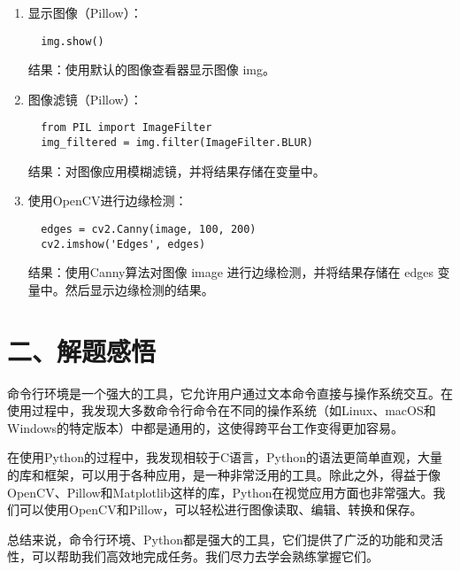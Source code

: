\documentclass[UTF8]{ctexart}
\begin{document}
\begin{enumerate}
  \item 显示图像（Pillow）：
  \begin{verbatim}
  img.show()
  \end{verbatim}
  结果：使用默认的图像查看器显示图像 img。
  
  \item 图像滤镜（Pillow）：
  \begin{verbatim}
  from PIL import ImageFilter
  img_filtered = img.filter(ImageFilter.BLUR)
  \end{verbatim}
  结果：对图像应用模糊滤镜，并将结果存储在变量中。
  
  \item 使用OpenCV进行边缘检测：
  \begin{verbatim}
  edges = cv2.Canny(image, 100, 200)
  cv2.imshow('Edges', edges)
  \end{verbatim}
  结果：使用Canny算法对图像 image 进行边缘检测，并将结果存储在 edges 变量中。然后显示边缘检测的结果。
\end{enumerate}

\section*{二、解题感悟}

命令行环境是一个强大的工具，它允许用户通过文本命令直接与操作系统交互。在使用过程中，我发现大多数命令行命令在不同的操作系统（如Linux、macOS和Windows的特定版本）中都是通用的，这使得跨平台工作变得更加容易。

在使用Python的过程中，我发现相较于C语言，Python的语法更简单直观，大量的库和框架，可以用于各种应用，是一种非常泛用的工具。除此之外，得益于像OpenCV、Pillow和Matplotlib这样的库，Python在视觉应用方面也非常强大。我们可以使用OpenCV和Pillow，可以轻松进行图像读取、编辑、转换和保存。

总结来说，命令行环境、Python都是强大的工具，它们提供了广泛的功能和灵活性，可以帮助我们高效地完成任务。我们尽力去学会熟练掌握它们。
\end{document}
